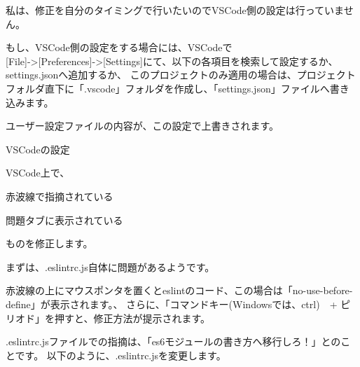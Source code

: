 \vspace*{\baselineskip}

私は、修正を自分のタイミングで行いたいのでVSCode側の設定は行っていません。

\vspace*{\baselineskip}

もし、VSCode側の設定をする場合には、VSCodeで\\[0pt]
[File]{-}\textgreater{}[Preferences]{-}\textgreater{}[Settings]にて、以下の各項目を検索して設定するか、settings.jsonへ追加するか、
このプロジェクトのみ適用の場合は、プロジェクトフォルダ直下に「.vscode」フォルダを作成し、「settings.json」ファイルへ書き込みます。

ユーザー設定ファイルの内容が、この設定で上書きされます。

\def\startercodeblockfontsize{}
\begin{starterprogram}[]{VSCodeの設定}\end{starterprogram}

VSCode上で、\\[0pt]

\begin{starteritemize}
\item 赤波線で指摘されている
\item 問題タブに表示されている
\end{starteritemize}

\vspace*{\baselineskip}

ものを修正します。

\vspace*{\baselineskip}

まずは、.eslintrc.js自体に問題があるようです。

赤波線の上にマウスポンタを置くとeslintのコード、この場合は「no{-}use{-}before{-}define」が表示されます。、
さらに、「コマンドキー(Windowsでは、ctrl)　+ ピリオド」を押すと、修正方法が提示されます。

.eslintrc.jsファイルでの指摘は、「es6モジュールの書き方へ移行しろ！」とのことです。
以下のように、.eslintrc.jsを変更します。

